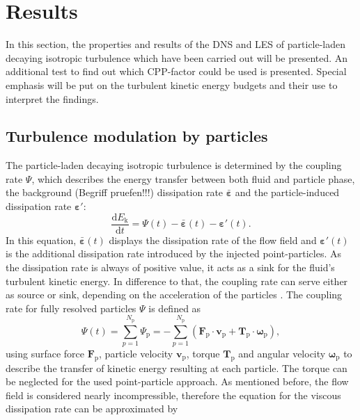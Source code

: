 \documentclass[11pt,a4paper,openany,oneside,parskip=half*]{article}
\renewcommand*\vec[1]{\boldsymbol{#1}}
\begin{document}
\section{Results}
In this section, the properties and results of the DNS and LES of particle-laden decaying isotropic turbulence which have been carried out will be presented. An additional test to find out which CPP-factor could be used is presented. Special emphasis will be put on the turbulent kinetic energy budgets and their use to interpret the findings.
\newline
\subsection{Turbulence modulation by particles}
The particle-laden decaying isotropic turbulence is determined by the coupling rate $\Psi$, which describes the energy transfer between both fluid and particle phase, the background (Begriff pruefen!!!) dissipation rate $\vec{\bar{\varepsilon}}$ and the particle-induced dissipation rate $\vec{\varepsilon}'$:
\begin{equation}
\frac{\mathrm{d} E_\mathrm{k}}{\mathrm{d} t} = \Psi (t) - \vec{\bar{\varepsilon}} (t) - \vec{\varepsilon}' (t).
\end{equation}
In this equation, $\vec{\bar{\varepsilon}} (t)$ displays the dissipation rate of the flow field and $\vec{\varepsilon}' (t)$ is the additional dissipation rate introduced by the injected point-particles. 
As the dissipation rate is always of positive value, it acts as a sink for the fluid's turbulent kinetic energy. In difference to that, the coupling rate can serve either as source or sink, depending on the acceleration of the particles \cite{mechanismsoftwowaycoupling}. The coupling rate for fully resolved particles $\Psi$ is defined as
\begin{equation}
\Psi (t) = \sum_{p=1}^{N_\mathrm{p}} \Psi_\mathrm{p}= - \sum_{p=1}^{N_\mathrm{p}} (\vec{F}_\mathrm{p} \cdot \vec{v}_\mathrm{p} + \vec{T}_\mathrm{p} \cdot \vec{\omega}_\mathrm{p}),
\end{equation}
using surface force $\vec{F}_\mathrm{p}$, particle velocity $\vec{v}_\mathrm{p}$, torque $\vec{T}_\mathrm{p}$ and angular velocity $\vec{\omega}_\mathrm{p}$ to describe the transfer of kinetic energy resulting at each particle. The torque can be neglected for the used point-particle approach.
\newline
As mentioned before, the flow field is considered nearly incompressible, therefore the equation  for the viscous dissipation rate can be approximated by
\end{document}
